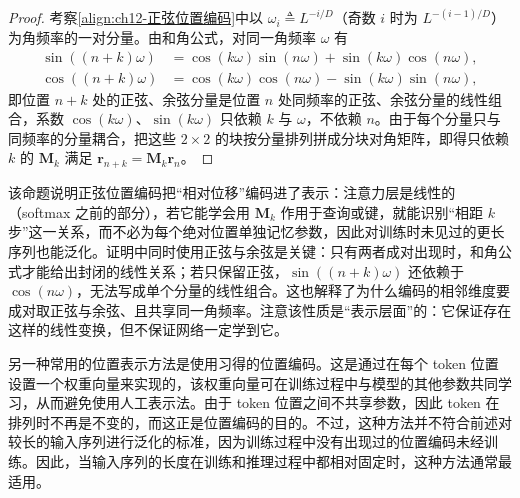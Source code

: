 \documentclass[../../main.tex]{subfiles}
\begin{document}
\begin{proof}
考察\eqref{align:ch12-正弦位置编码}中以 $\omega_i\triangleq L^{-i/D}$（奇数 $i$ 时为 $L^{-(i-1)/D}$）为角频率的一对分量。由和角公式，对同一角频率 $\omega$ 有
\begin{align*}
\sin\left((n+k)\omega\right)&=\cos(k\omega)\sin(n\omega)+\sin(k\omega)\cos(n\omega),\\
\cos\left((n+k)\omega\right)&=\cos(k\omega)\cos(n\omega)-\sin(k\omega)\sin(n\omega),
\end{align*}
即位置 $n+k$ 处的正弦、余弦分量是位置 $n$ 处同频率的正弦、余弦分量的线性组合，系数 $\cos(k\omega)$、$\sin(k\omega)$ 只依赖 $k$ 与 $\omega$，不依赖 $n$。由于每个分量只与同频率的分量耦合，把这些 $2\times2$ 的块按分量排列拼成分块对角矩阵，即得只依赖 $k$ 的 $\mathbf{M}_k$ 满足 $\mathbf{r}_{n+k}=\mathbf{M}_k\mathbf{r}_n$。
\end{proof}

\begin{remark}
该命题说明正弦位置编码把“相对位移”编码进了表示：注意力层是线性的（softmax 之前的部分），若它能学会用 $\mathbf{M}_k$ 作用于查询或键，就能识别“相距 $k$ 步”这一关系，而不必为每个绝对位置单独记忆参数，因此对训练时未见过的更长序列也能泛化。证明中同时使用正弦与余弦是关键：只有两者成对出现时，和角公式才能给出封闭的线性关系；若只保留正弦，$\sin((n+k)\omega)$ 还依赖于 $\cos(n\omega)$，无法写成单个分量的线性组合。这也解释了为什么编码的相邻维度要成对取正弦与余弦、且共享同一角频率。注意该性质是“表示层面”的：它保证存在这样的线性变换，但不保证网络一定学到它。
\end{remark}

另一种常用的位置表示方法是使用习得的位置编码。这是通过在每个 token 位置设置一个权重向量来实现的，该权重向量可在训练过程中与模型的其他参数共同学习，从而避免使用人工表示法。由于 token 位置之间不共享参数，因此 token 在排列时不再是不变的，而这正是位置编码的目的。不过，这种方法并不符合前述对较长的输入序列进行泛化的标准，因为训练过程中没有出现过的位置编码未经训练。因此，当输入序列的长度在训练和推理过程中都相对固定时，这种方法通常最适用。
\end{document}
